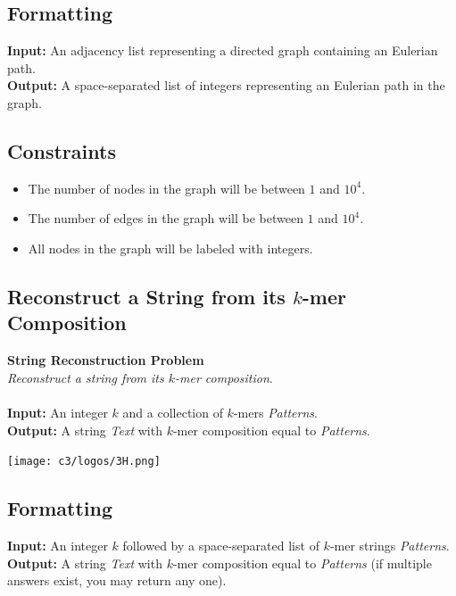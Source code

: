 \documentclass{article}
\begin{document}
\subsection*{Formatting}
\noindent\textbf{Input:} An adjacency list representing a directed graph containing an Eulerian path.\\
\noindent\textbf{Output:} A space-separated list of integers representing an Eulerian path in the graph.

\subsection*{Constraints}
\begin{itemize}
    \item The number of nodes in the graph will be between $1$ and $10^4$.
    \item The number of edges in the graph will be between $1$ and $10^4$.
    \item All nodes in the graph will be labeled with integers.
\end{itemize}
\pagebreak

\subsection{Reconstruct a String from its $k$-mer Composition}
\hline\vspace{5}
\textbf{String Reconstruction Problem}\\
\emph{Reconstruct a string from its $k$-mer composition}.\\ \\
\textbf{Input:} An integer $k$ and a collection of $k$-mers \emph{Patterns}.\\
\textbf{Output:} A string \emph{Text} with $k$-mer composition equal to \emph{Patterns}.
\begin{center}
    \texttt{[image: c3/logos/3H.png]}
\end{center}
\hline\vspace{5}

\subsection*{Formatting}
\noindent\textbf{Input:} An integer $k$ followed by a space-separated list of $k$-mer strings \emph{Patterns}.\\
\noindent\textbf{Output:} A string \emph{Text} with $k$-mer composition equal to \emph{Patterns} (if multiple answers exist, you may return any one).
\end{document}
